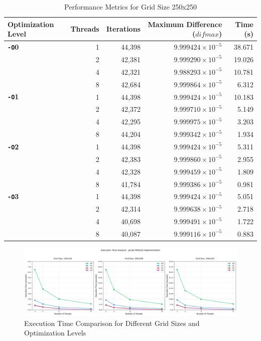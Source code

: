 \documentclass{article}
\begin{document}
\begin{table}[H]
    \centering
    \caption{Performance Metrics for Grid Size 250x250}
    \label{tab:performance_250}
    \begin{tabular}{l r r r r}
    \toprule
    \textbf{Optimization Level} & \textbf{Threads} & \textbf{Iterations} & \textbf{Maximum Difference ($difmax$)} & \textbf{Time (s)} \\
    \midrule
    \textbf{\texttt{-O}0} & 1 & 44,398 & $9.999424 \times 10^{-5}$ & 38.671 \\
        & 2 & 42,381 & $9.999290 \times 10^{-5}$ & 19.026 \\
        & 4 & 42,321 & $9.988293 \times 10^{-5}$ & 10.781 \\
        & 8 & 42,684 & $9.999864 \times 10^{-5}$ & 6.312 \\
    \midrule
    \textbf{\texttt{-O}1} & 1 & 44,398 & $9.999424 \times 10^{-5}$ & 10.183 \\
        & 2 & 42,372 & $9.999710 \times 10^{-5}$ & 5.149 \\
        & 4 & 42,295 & $9.999975 \times 10^{-5}$ & 3.203 \\
        & 8 & 44,204 & $9.999342 \times 10^{-5}$ & 1.934 \\
    \midrule
    \textbf{\texttt{-O}2} & 1 & 44,398 & $9.999424 \times 10^{-5}$ & 5.311 \\
        & 2 & 42,383 & $9.999860 \times 10^{-5}$ & 2.955 \\
        & 4 & 42,328 & $9.999459 \times 10^{-5}$ & 1.809 \\
        & 8 & 41,784 & $9.999386 \times 10^{-5}$ & 0.981 \\
    \midrule
    \textbf{\texttt{-O}3} & 1 & 44,398 & $9.999424 \times 10^{-5}$ & 5.051 \\
        & 2 & 42,314 & $9.999638 \times 10^{-5}$ & 2.718 \\
        & 4 & 40,698 & $9.999491 \times 10^{-5}$ & 1.722 \\
        & 8 & 40,087 & $9.999116 \times 10^{-5}$ & 0.883 \\
    \bottomrule
    \end{tabular}
\end{table}

\begin{figure}[H]
    \centering
    \includegraphics[width=\linewidth]{Images/Plot1.png}
    \caption{Execution Time Comparison for Different Grid Sizes and Optimization Levels}
    \label{fig:plot1}
\end{figure}
\end{document}
